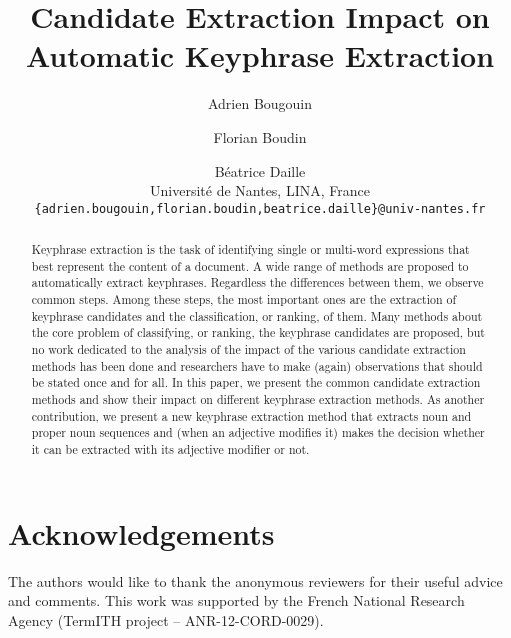 \documentclass[11pt]{article}
\title{Candidate Extraction Impact on Automatic Keyphrase Extraction}
\author{
  Adrien Bougouin \and Florian Boudin \and Béatrice Daille\\
  Université de Nantes, LINA, France\\
  {\tt \{adrien.bougouin,florian.boudin,beatrice.daille\}@univ-nantes.fr}
}
\date{}
\begin{document}
  \maketitle
  \begin{abstract}
    Keyphrase extraction is the task of identifying single or multi-word
    expressions that best represent the content of a document. A wide range of
    methods are proposed to automatically extract keyphrases. Regardless the
    differences between them, we observe common steps. Among these steps, the
    most important ones are the extraction of keyphrase candidates and the
    classification, or ranking, of them. Many methods about the core problem of
    classifying, or ranking, the keyphrase candidates are proposed, but no work
    dedicated to the analysis of the impact of the various candidate extraction
    methods has been done and researchers have to make (again) observations that
    should be stated once and for all. In this paper, we present the common
    candidate extraction methods and show their impact on different keyphrase
    extraction methods. %
    As another contribution, we present a new keyphrase extraction method that
    extracts noun and proper noun sequences and (when an adjective modifies it)
    makes the decision whether it can be extracted with its adjective modifier
    or not.
  \end{abstract}

  

  \section*{Acknowledgements}
  The authors would like to thank the anonymous reviewers for their useful
  advice and comments. This work was supported by the French National Research
  Agency (TermITH project -- ANR-12-CORD-0029).

  
  
\end{document}
